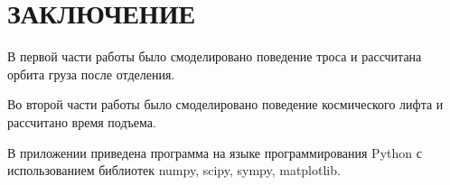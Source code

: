 \section*{ЗАКЛЮЧЕНИЕ}

В первой части работы было смоделировано поведение троса и рассчитана орбита груза после отделения.

Во второй части работы было смоделировано поведение космического лифта и рассчитано время подъема.

В приложении приведена программа на языке программирования Python с использованием библиотек numpy, scipy, sympy, matplotlib.